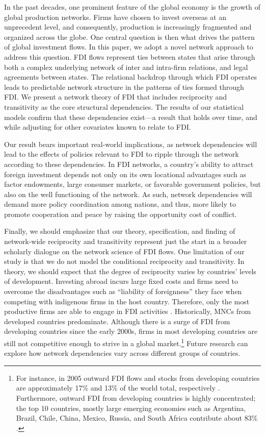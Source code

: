 \documentclass[reqno,onecolumn,letterpaper,12pt]{article}
\begin{document}
In the past decades, one prominent feature of the global economy is the growth of global production networks. Firms have chosen to invest overseas at an unprecedent level, and consequently, production is increasingly fragmented and organized across the globe. One central question is then what drives the pattern of global investment flows. In this paper, we adopt a novel network approach to address this question. FDI flows represent ties between states that arise through both a complex underlying network of inter and intra-firm relations, and legal agreements between states. The relational backdrop through which FDI operates leads to predictable network structure in the patterns of ties formed through FDI. We present a network theory of FDI that includes reciprocity and transitivity as the core structural dependencies. The results of our statistical models confirm that these dependencies exist---a result that holds over time, and while adjusting for other covariates known to relate to FDI. 

Our result bears important real-world implications, as network dependencies will lead to the effects of policies relevant to FDI to ripple through the network according to these dependencies. In FDI networks, a country's ability to attract foreign investment depends not only on its own locational advantages such as factor endowments, large consumer markets, or favorable government policies, but also on the well functioning of the network. As such, network dependencies will demand more policy coordination among nations, and thus, more likely to promote cooperation and peace by raising the opportunity cost of conflict.


Finally, we should emphasize that our theory, specification, and finding of network-wide reciprocity and transitivity represent just the start in a broader scholarly dialogue on the network science of FDI flows. One limitation of our study is that we do not model the conditional reciprocity and transitivity. In theory, we should expect that the degree of reciprocity varies by countries' levels of development. Investing abroad incurs large fixed costs and firms need to overcome the disadvantages such as ``liability of foreignness'' they face when competing with indigenous firms in the host country. Therefore, only the most productive firms are able to engage in FDI activities \citep{Melitz:2003,Helpman_et_al:2004}. Historically, MNCs from developed countries predominate. Although there is a surge of FDI from developing countries since the early 2000s, firms in most developing countries are still not competitive enough to strive in a global market.\footnote{For instance, in 2005 outward FDI flows and stocks from developing countries are approximately 17\% and 13\% of the world total, respectively \citep{UNCTAD:2006}. Furthermore, outward FDI from developing countries is highly concentrated; the top 10 countries, mostly large emerging economies such as Argentina, Brazil, Chile, China, Mexico, Russia, and South Africa contribute about 83\% \citep{UNCTAD:2006}. } Future research can explore how network dependencies vary across different groups of countries.
\end{document}
